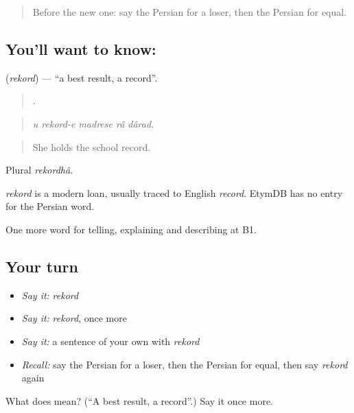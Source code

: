 \begin{quote}
Before the new one: say the Persian for a loser, then the Persian for equal.
\end{quote}

\subsection*{You'll want to know: }
\textbf{} (\emph{rekord}) — \textquotedblleft{}a best result, a record\textquotedblright{}.

\begin{quote}
    .
\end{quote}

\begin{quote}
\emph{u rekord-e madrese râ dârad.}
\end{quote}

\begin{quote}
She holds the school record.
\end{quote}

Plural \emph{rekordhâ}.

\begin{cousinweb}
\emph{rekord} is a modern loan, usually traced to English \emph{record}. EtymDB has no entry for the Persian word.
\end{cousinweb}

\begin{grammarlens}[title={What you've built}]
One more word for telling, explaining and describing at B1.
\end{grammarlens}

\subsection*{Your turn}
\begin{itemize}
\raggedright
  \item \emph{Say it:} \emph{rekord}
  \item \emph{Say it:} \emph{rekord}, once more
  \item \emph{Say it:} a sentence of your own with \emph{rekord}
  \item \emph{Recall:} say the Persian for a loser, then the Persian for equal, then say \emph{rekord} again
\end{itemize}

\begin{tcolorbox}[breakable,colback=teal!4,colframe=teal!35!black,title={Before you move on}]
What does  mean? (\textquotedblleft{}A best result, a record\textquotedblright{}.) Say it once more.
\end{tcolorbox}
